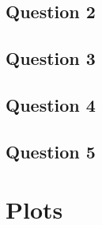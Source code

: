 \documentclass[12pt]{article}
\begin{document}
\subsection{Question 2}
\subsection{Question 3}
\subsection{Question 4}
\subsection{Question 5}

\section{Plots}
\end{document}
